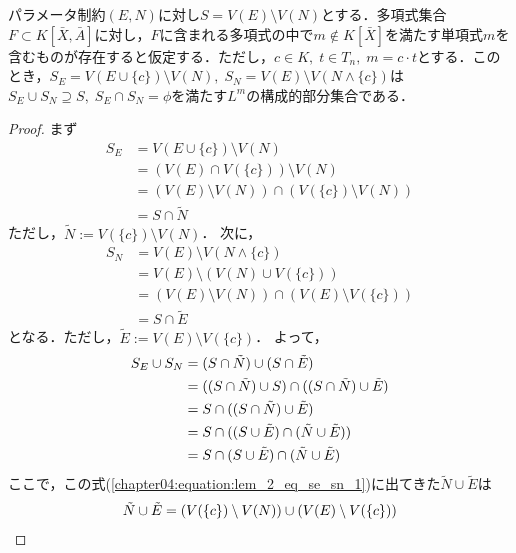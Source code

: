 \begin{lemma}
	\label{chapter04:lemma:for_alg_2}
	パラメータ制約$(E, N)$に対し$S = V(E) \setminus V(N)$とする．多項式集合$F \subset K[\bar{X}, \bar{A}]$に対し，$F$に含まれる多項式の中で$m \notin K[\bar{X}]$を満たす単項式$m$を含むものが存在すると仮定する．ただし，$c \in K,\; t \in T_n, \; m = c \cdot t$とする．このとき，$S_E = V(E \cup \{ c \}) \setminus V(N), \; S_N = V(E) \setminus V(N \land \{ c \})$は$S_E \cup S_N \supseteq S,\; S_E \cap S_N = \phi$を満たす$L^m$の構成的部分集合である．
\end{lemma}


\begin{proof}
	まず
	\begin{align*}
		S_E &= V(E \cup \{ c \}) \setminus V(N) \\
		&= (V(E) \cap V(\{ c \})) \setminus V(N) \\
		&= \left( V(E) \setminus V(N) \right) \cap \left( V(\{ c \}) \setminus V(N) \right) \\
		&= S \cap \tilde{N}
	\end{align*}
	ただし，$\tilde{N} :=  V(\{ c \}) \setminus V(N)$．
	次に，
	\begin{align*}
		S_N &= V(E) \setminus V(N \land \{ c \}) \\
		&= V(E) \setminus ( V(N) \cup V(\{ c \}) ) \\
		&= \left( V(E) \setminus V(N) \right) \cap \left( V(E) \setminus V(\{ c \}) \right) \\
		&= S \cap \tilde{E}
	\end{align*}
	となる．ただし，$\tilde{E} := V(E) \setminus V(\{ c \})$．
	よって，
	\begin{align}
		S_E \cup S_N &= (S \cap \tilde{N}) \cup (S \cap \tilde{E}) \notag\\
		&= ((S \cap \tilde{N}) \cup S) \cap ((S \cap \tilde{N}) \cup \tilde{E}) \notag\\
		&= S \cap ((S \cap \tilde{N}) \cup \tilde{E}) \notag\\
		&= S \cap ((S \cup \tilde{E}) \cap (\tilde{N} \cup \tilde{E})) \notag\\
		&= S \cap (S \cup \tilde{E}) \cap (\tilde{N} \cup \tilde{E}) \label{chapter04:equation:lem_2_eq_se_sn_1}
	\end{align}
	ここで，この式(\ref{chapter04:equation:lem_2_eq_se_sn_1})に出てきた$\tilde{N} \cup \tilde{E}$は
	\begin{align}
		\tilde{N} \cup \tilde{E} &= (V(\{ c \}) \setminus V(N)) \cup (V(E) \setminus V(\{ c \})) \notag \\

\end{align}
\end{proof}
